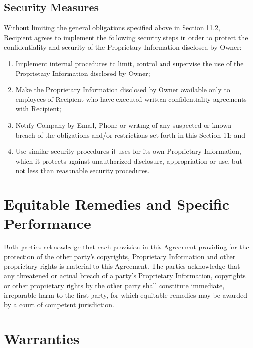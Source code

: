 \documentclass[letterpaper,10pt,openany,oneside,english]{sphinxmanual}
\begin{document}
\subsection{Security Measures}
\label{\detokenize{nondisclosure:security-measures}}
Without limiting the general obligations specified above in
Section 11.2, Recipient agrees to implement the following security steps in order to protect the confidentiality and security of the Proprietary Information disclosed by Owner:
\begin{enumerate}
\item {} 
Implement internal procedures to limit, control and supervise the use of the Proprietary Information disclosed by Owner;

\item {} 
Make the Proprietary Information disclosed by Owner available only to employees of Recipient who have executed written confidentiality agreements with Recipient;

\item {} 
Notify Company by Email, Phone or writing of any suspected or known breach of the obligations and/or restrictions set forth in this Section 11; and

\item {} 
Use similar security procedures it uses for its own Proprietary Information, which it protects against unauthorized disclosure, appropriation or use, but not less than reasonable security procedures.

\end{enumerate}


\section{Equitable Remedies and Specific Performance}
\label{\detokenize{remedyandperformance:equitable-remedies-and-specific-performance}}\label{\detokenize{remedyandperformance::doc}}
Both parties acknowledge that each provision in this Agreement providing for the protection of the other party’s copyrights, Proprietary Information and other proprietary rights is material to this Agreement. The parties acknowledge that any threatened or actual breach of a party’s Proprietary Information, copyrights or other proprietary rights by the other party shall constitute immediate, irreparable harm to the first party, for which equitable remedies may be awarded by a court of competent jurisdiction.


\section{Warranties}
\label{\detokenize{warranties:warranties}}\label{\detokenize{warranties::doc}}
\end{document}
